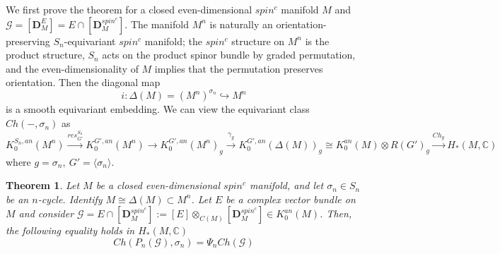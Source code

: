 \documentclass[11pt,leqno,twoside]{amsart}
\theoremstyle{plainsl}
\newtheorem{theorem}{Theorem}[section]
\theoremstyle{definition}
\newcommand{\bD}{\mathbf{D}}
\begin{document}
We first prove the theorem for a  closed even-dimensional $spin^c$ manifold $M$ and $\mathcal{G}=[\bD_M^E]=E\cap[\bD_M^{spin^c}]$. The manifold $M^n$ is naturally an orientation-preserving
$S_n$-equivariant $spin^c$ manifold; the $spin^c$ structure on $M^n$
is the product structure, $S_n$ acts on the product spinor bundle by
graded permutation, and the even-dimensionality of $M$ implies that
the permutation preserves orientation. Then the diagonal map
\[
i:\Delta(M)=(M^n)^{\sigma_n}\hookrightarrow M^n
\]
is a smooth equivariant embedding. We can  view the equivariant class $ Ch(-,\sigma_n)$  as $$K_0^{S_n,an}(M^n) \xrightarrow{res_{G'}^{S_n}}  K_0^{G',an}(M^n) \rightarrow K_0^{G',an}(M^n)_{{g}}\xrightarrow{\gamma_{g}}  K_0^{G',an}(\Delta(M))_{{g}} \cong  K_0^{an}(M)\otimes R(G')_{{g}}\xrightarrow{Ch_g} H_*(M,\mathbb{C})$$
where $g=\sigma_n,\: G'=\langle \sigma_n\rangle$.
\begin{theorem}\label{problemmoon} Let  $M$ be a closed even-dimensional $spin^c$ manifold, and  let $ \sigma_n\in S_n$ be an $n$-cycle. Identify $M\cong \Delta(M)\subset M^n$. Let $E$ be a complex vector bundle on $M$ and consider 
$\mathcal{G}=E\cap[\bD_M^{spin^c}]:=[E]\otimes_{C(M)}[\bD_M^{spin^c}]\in K_0^{an} (M)$. Then,   the following equality holds in $H_*(M,\mathbb{C})$ 
\begin{equation}
 Ch(P_n(\mathcal{G}),\sigma_n)=\Psi_n Ch(\mathcal{G})
\end{equation} 
\end{theorem}
\end{document}
